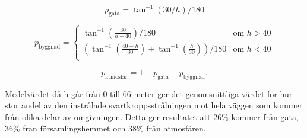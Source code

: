 \begin{equation}
p_\text{gata}=\tan^{-1}(30/h)/180
\end{equation}

\begin{equation}
p_\text{byggnad}= \left\{
\begin{array}{rl}
\tan^{-1}(\frac{30}{h-40})/180 & \text{om } h > 40 \\
(\tan^{-1}(\frac{40-h}{30})+\tan^{-1}(\frac{h}{30}))/180 & \text{om } h < 40 \\
\end{array} \right.
\end{equation}

\begin{equation}
p_\text{atmosfär}=1-p_\text{gata}-p_\text{byggnad}.
\end{equation}

Medelvärdet då h går från 0 till 66 meter ger det genomsnittliga värdet för hur stor andel 
av den instrålade svartkroppsstrålningen mot hela väggen som kommer från olika delar
 av omgivningen. Detta ger resultatet att 26\% kommer från gata, 36\% från 
 församlingshemmet och 38\% från atmosfären.
